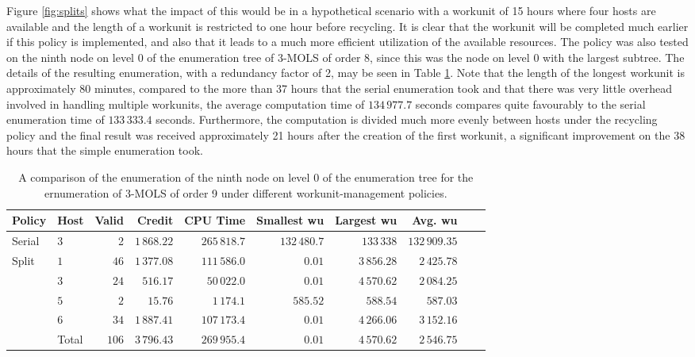 Figure \ref{fig:splits} shows what the impact of this would be in a hypothetical scenario with a workunit of 15 hours where four hosts are available and the length of a workunit is restricted to one hour before recycling. It is clear that the workunit will be completed much earlier if this policy is implemented, and also that it leads to a much more efficient utilization   of the available resources. The policy was also tested on the ninth node on level 0 of the enumeration tree of 3-MOLS of order 8, since this was the node on level 0 with the largest subtree. The details of the resulting enumeration, with a redundancy factor of 2, may be seen in Table \ref{839splits}. Note that the length of the longest workunit is approximately 80 minutes, compared to the more than 37 hours that the serial enumeration took and that there was very little overhead involved in handling multiple workunits, the average computation time of $134\,977.7$ seconds compares quite favourably to the serial enumeration time of $133\,333.4$ seconds. Furthermore, the computation is divided much more evenly between hosts under the recycling policy and the final result was received approximately 21 hours after the creation of the first workunit, a significant improvement on the 38 hours that the simple enumeration took.
\begin{table}[t]
 \centering
 \caption{A comparison of the enumeration of the ninth node on level 0 of the enumeration tree for the ernumeration of 3-MOLS of order 9 under different workunit-management policies.}
\begin{tabular}{llrrrrrrrr}
\toprule
Policy & Host   & Valid   & Credit   & CPU Time& Smallest wu & Largest wu& Avg. wu\\ \midrule
Serial & 3 & 2 & $1\,868.22$ & $265\,818.7$ & $132\,480.7$ &$133\,338$& $132\,909.35$\\ \midrule
\multirow{5}{2cm}{Split} &$1$   & $46$  & $1\,377.08$ & $111\,586.0$ & $0.01$ & $3\,856.28$ & $2\,425.78$ \\
&$3$   & $24$  & $516.17$ & $50\,022.0$ & $0.01$ & $4\,570.62$ & $2\,084.25$ \\
&$5$   & $2$   & $15.76$ & $1\,174.1$ & $585.52$ & $588.54$ & $587.03$ \\
&$6$   & $34$  & $1\,887.41$ & $107\,173.4$ & $0.01$ & $4\,266.06$ & $3\,152.16$ \\ \cmidrule{2-8}
& Total   & $106$  & $3\,796.43$& $269\,955.4$ & $0.01$& $4\,570.62$ & $2\,546.75$\\ \bottomrule
\end{tabular}\vspace*{-.4cm}
\label{839splits}
\end{table}




